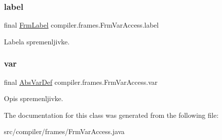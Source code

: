 \subsubsection{\texorpdfstring{label}{label}}
{\footnotesize\ttfamily final \hyperlink{classcompiler_1_1frames_1_1_frm_label}{Frm\+Label} compiler.\+frames.\+Frm\+Var\+Access.\+label}

Labela spremenljivke. \mbox{\label{classcompiler_1_1frames_1_1_frm_var_access_aa9895a335450c7c006d8f47d56a3c843}} 
\subsubsection{\texorpdfstring{var}{var}}
{\footnotesize\ttfamily final \hyperlink{classcompiler_1_1abstr_1_1tree_1_1def_1_1_abs_var_def}{Abs\+Var\+Def} compiler.\+frames.\+Frm\+Var\+Access.\+var}

Opis spremenljivke. 

The documentation for this class was generated from the following file\+:\begin{DoxyCompactItemize}
\item 
src/compiler/frames/Frm\+Var\+Access.\+java\end{DoxyCompactItemize}
